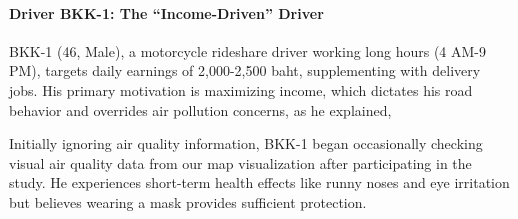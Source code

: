 

\paragraph{Driver BKK-1: The ``Income-Driven'' Driver}

BKK-1 (46, Male), a motorcycle rideshare driver working long hours (4 AM-9 PM), targets daily earnings of 2,000-2,500 baht, supplementing with delivery jobs.
His primary motivation is maximizing income, which dictates his road behavior and overrides air pollution concerns,
as he explained, 


Initially ignoring air quality information, BKK-1 began occasionally checking visual air quality data from our map visualization after participating in the study.
He experiences short-term health effects like runny noses and eye irritation but believes wearing a mask provides sufficient protection.

